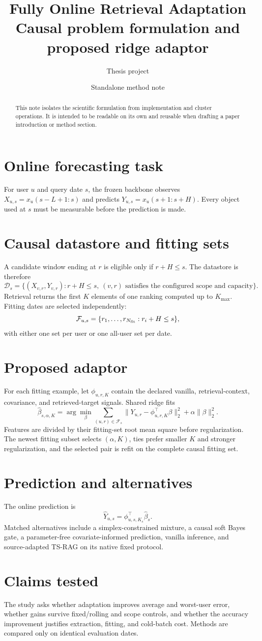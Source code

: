 \documentclass[10pt]{article}
\title{\color{navy}Fully Online Retrieval Adaptation\\[3pt]\large Causal problem formulation and proposed ridge adaptor}
\author{Thesis project}
\date{Standalone method note}
\begin{document}
\maketitle
\begin{abstract}
This note isolates the scientific formulation from implementation and cluster
operations. It is intended to be readable on its own and reusable when drafting
a paper introduction or method section.
\end{abstract}

\section{Online forecasting task}
For user $u$ and query date $s$, the frozen backbone observes
$X_{u,s}=x_u(s-L+1{:}s)$ and predicts $Y_{u,s}=x_u(s+1{:}s+H)$.
Every object used at $s$ must be measurable before the prediction is made.

\section{Causal datastore and fitting sets}
A candidate window ending at $r$ is eligible only if $r+H\le s$. The
datastore is therefore
\[
 \mathcal D_s=\{(X_{v,r},Y_{v,r}):r+H\le s,\ (v,r)\text{ satisfies the
 configured scope and capacity}\}.
\]
Retrieval returns the first $K$ elements of one ranking computed up to
$K_{\max}$. Fitting dates are selected independently:
\[
 \mathcal F_{u,s}=\{r_1,\ldots,r_{N_{\rm fit}}:r_i+H\le s\},
\]
with either one set per user or one all-user set per date.

\section{Proposed adaptor}
For each fitting example, let $\phi_{u,r,K}$ contain the declared vanilla,
retrieval-context, covariance, and retrieved-target signals. Shared ridge fits
\[
 \widehat\beta_{s,\alpha,K}
 =\arg\min_\beta\sum_{(u,r)\in\mathcal F_s}
 \|Y_{u,r}-\phi_{u,r,K}^{\top}\beta\|_2^2
 +\alpha\|\beta\|_2^2.
\]
Features are divided by their fitting-set root mean square before
regularization. The newest fitting subset selects $(\alpha,K)$, ties prefer
smaller $K$ and stronger regularization, and the selected pair is refit on the
complete causal fitting set.

\section{Prediction and alternatives}
The online prediction is
\[
 \widehat Y_{u,s}=\phi_{u,s,K_s}^{\top}\widehat\beta_s.
\]
Matched alternatives include a simplex-constrained mixture, a causal soft
Bayes gate, a parameter-free covariate-informed prediction, vanilla inference,
and source-adapted TS-RAG on its native fixed protocol.

\section{Claims tested}
The study asks whether adaptation improves average and worst-user error,
whether gains survive fixed/rolling and scope controls, and whether the
accuracy improvement justifies extraction, fitting, and cold-batch cost.
Methods are compared only on identical evaluation dates.
\end{document}
